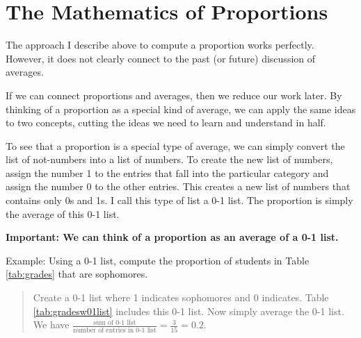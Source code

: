 \documentclass[]{book}
\theoremstyle{definition}
\theoremstyle{definition}
\theoremstyle{definition}
\theoremstyle{remark}
\begin{document}
\section{The Mathematics of
Proportions}\label{the-mathematics-of-proportions}

The approach I describe above to compute a proportion works perfectly.
However, it does not clearly connect to the past (or future) discussion
of averages.

If we can connect proportions and averages, then we reduce our work
later. By thinking of a proportion as a special kind of average, we can
apply the same ideas to two concepts, cutting the ideas we need to learn
and understand in half.

To see that a proportion is a special type of average, we can simply
convert the list of not-numbers into a list of numbers. To create the
new list of numbers, assign the number 1 to the entries that fall into
the particular category and assign the number 0 to the other entries.
This creates a new list of numbers that contains only 0s and 1s. I call
this type of list a 0-1 list. The proportion is simply the average of
this 0-1 list.

\textbf{Important: We can think of a proportion as an average of a 0-1
list.}

Example: Using a 0-1 list, compute the proportion of students in Table
\ref{tab:grades} that are sophomores.

\begin{quote}
Create a 0-1 list where 1 indicates sophomores and 0 indicates. Table
\ref{tab:gradesw01list} includes this 0-1 list. Now simply average the
0-1 list. We have
\(\frac{\text{sum of 0-1 list}}{\text{number of entries in 0-1 list}} = \frac{3}{15} = 0.2\).
\end{quote}

\end{document}
